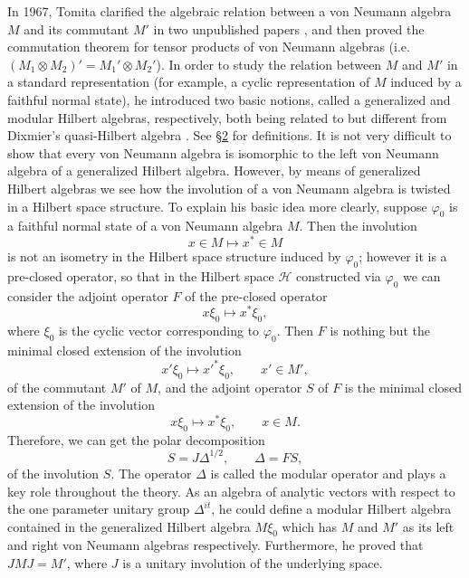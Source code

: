 \documentclass[12pt,b5paper,twoside]{article}
\theoremstyle{takesaki}
\numberwithin{equation}{section}
\begin{document}
In 1967, Tomita clarified the algebraic relation between a von Neumann
algebra $M$ and its commutant $M'$ in two unpublished papers
\cite{ref21,ref22}, and then proved the commutation theorem for tensor
products of von Neumann algebras (i.e.
$(M_1\otimes M_2)'=M_1'\otimes M_2'$).
In order to study the relation between $M$ and $M'$ in a standard
representation (for example, a cyclic representation of $M$ induced by
a faithful normal state), he introduced two basic notions, called a
generalized and modular Hilbert algebras, respectively, both being
related to but different from Dixmier's quasi-Hilbert algebra
\cite{ref4}.  See \hyperref[sec:2]{\S2} for definitions.  It is not very
difficult to show that every von Neumann algebra is isomorphic to the
left von Neumann algebra of a generalized Hilbert algebra.  However, by
means of generalized Hilbert algebras we see how the involution of a von
Neumann algebra is twisted in a Hilbert space structure.  To explain his
basic idea more clearly, suppose $\varphi _0$ is a faithful normal state
of a von Neumann algebra $M$.  Then the involution
\[
  x\in M\longmapsto x^*\in M
\]
is not an isometry in the Hilbert space structure induced by
$\varphi _0$; however it is a pre-closed operator, so that in the Hilbert
space $\mathcal H$ constructed via $\varphi _0$ we can consider the
adjoint operator $F$ of the pre-closed operator
\[
  x\xi _0\longmapsto x^*\xi _0,
\]
where $\xi _0$ is the cyclic vector corresponding to $\varphi _0$.
Then $F$ is nothing but the minimal closed extension of the involution
\[
  x'\xi _0\longmapsto x'^*\xi _0,\qquad x'\in M',
\]
of the commutant $M'$ of $M$, and the adjoint operator $S$ of $F$ is the
minimal closed extension of the involution
\[
  x\xi _0\longmapsto x^*\xi _0,\qquad x\in M.
\]
Therefore, we can get the polar decomposition
\[
  S=J\Delta^{1/2},\qquad \Delta=FS,
\]
of the involution $S$.  The operator $\Delta$ is called the modular
operator and plays a key role throughout the theory.  As an algebra of
analytic vectors with respect to the one parameter unitary group
$\Delta^{it}$, he could define a modular Hilbert algebra contained in the
generalized Hilbert algebra $M\xi _0$ which has $M$ and $M'$ as its left
and right von Neumann algebras respectively.  Furthermore, he proved
that $JMJ=M'$, where $J$ is a unitary involution of the underlying space.
\end{document}
